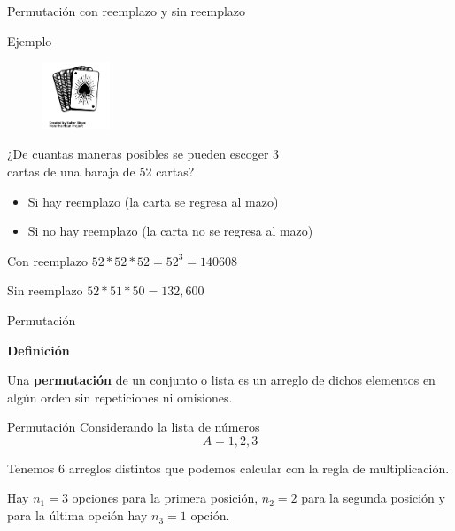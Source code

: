\documentclass{beamer}
\begin{document}
\begin{frame}{Permutación con reemplazo y sin reemplazo}
  \begin{exampleblock}{Ejemplo}
    \begin{figure}
      \raggedleft
      \includegraphics[width=2cm,angle=0,trim={1mm 250mm 1mm 310mm},clip]{figures/deck-of-cards.png}
    \end{figure}

    ¿De cuantas maneras posibles se pueden escoger 3 
    \\cartas de una baraja de 52
    cartas?
    \begin{itemize}
      \item Si hay reemplazo (la carta se regresa al mazo)
      \item Si no hay reemplazo (la carta no se regresa al mazo)
    \end{itemize}
  \end{exampleblock}

  \begin{exampleblock}{Con reemplazo}
    \centering
    $52*52*52 = 52^{3} = 140 608$
  \end{exampleblock}

  \begin{exampleblock}{Sin reemplazo}
    \centering
    $52*51*50 = 132,600$
  \end{exampleblock}

\end{frame}

\begin{frame}{Permutación}

  \textbf{Definición}


  Una \textbf{permutaci\'on} de un conjunto o lista es un arreglo de dichos
  elementos en alg\'un orden sin repeticiones ni omisiones.

\end{frame}

\begin{frame}{Permutación}
  Considerando la lista de números
  \begin{equation}
    A = {1,2,3}
  \end{equation}

  Tenemos 6 arreglos distintos que podemos calcular con la regla de
  multiplicación.
    
  Hay 
  \vfill
  $n_1 = 3$ opciones para la primera posición, 
  \vfill
  $n_2 = 2$ para la segunda posición y para la última opción hay 
  \vfill
  $n_3 = 1$ opción.

\end{frame}
\end{document}
